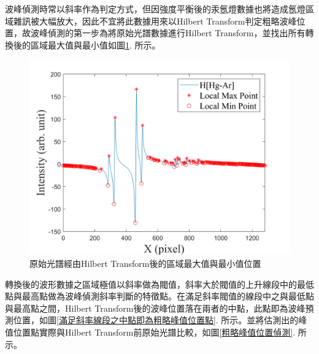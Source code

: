 波峰偵測時常以斜率\cite{slope-find-peak}作為判定方式，但因強度平衡後的汞氬燈數據也將造成氬燈區域雜訊被大幅放大，因此不宜將此數據用來以Hilbert Transform判定粗略波峰位置，故波峰偵測的第一步為將原始光譜數據進行Hilbert Transform，並找出所有轉換後的區域最大值與最小值如圖\ref{光譜經由希爾伯特轉換後的區域最大值與最小值位置}. 所示。
\begin{figure}[H] %
	\centering %
	\vspace{0.8cm}
	\includegraphics[width=\textwidth]{figures/Hil_HGAR_MAX_MIN.PNG} %
	\caption{原始光譜經由Hilbert Transform後的區域最大值與最小值位置} %
	\label{光譜經由希爾伯特轉換後的區域最大值與最小值位置} %
\end{figure}
轉換後的波形數據之區域極值以斜率做為閥值，斜率大於閥值的上升線段中的最低點與最高點做為波峰偵測斜率判斷的特徵點。在滿足斜率閥值的線段中之與最低點與最高點之間，Hilbert Transform後的波峰位置落在兩者的中點，此點即為波峰預測位置，如圖\ref{滿足斜率線段之中點即為粗略峰值位置點}. 所示。並將估測出的峰值位置點實際與Hilbert Transform前原始光譜比較，如圖\ref{粗略峰值位置偵測}. 所示。
